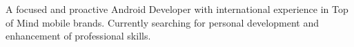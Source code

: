 \documentclass[9pt]{developercv} %
\begin{document}
\vspace{0.5cm}



\begin{minipage}[t]{0.4\textwidth} %
	\vspace{-\baselineskip} %
A focused and proactive Android Developer with international experience in Top of Mind mobile brands. Currently searching for personal development and enhancement of professional skills.
\end{minipage}
\hfill %
\begin{minipage}[t]{0.5\textwidth} %
	\vspace{-\baselineskip} %
	\begin{barchart}{5.5}
	\end{barchart}
\end{minipage}

\end{document}
